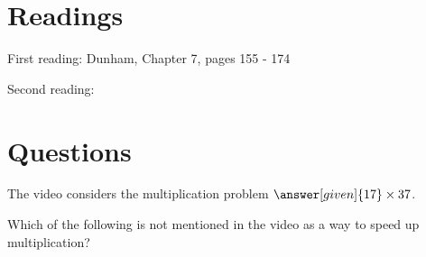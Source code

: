 \documentclass[nooutcomes]{ximera}
\begin{document}
\section{Readings}
First reading: Dunham, Chapter 7, pages 155 - 174

Second reading: 



\section{Questions}

\begin{question}
The video considers the multiplication problem $\answer[given]{17} \times 37$.
\end{question}

\begin{question}
Which of the following is not mentioned in the video as a way to speed up multiplication?
\begin{multipleChoice}
\end{multipleChoice}
\end{question}


%
\end{document}
